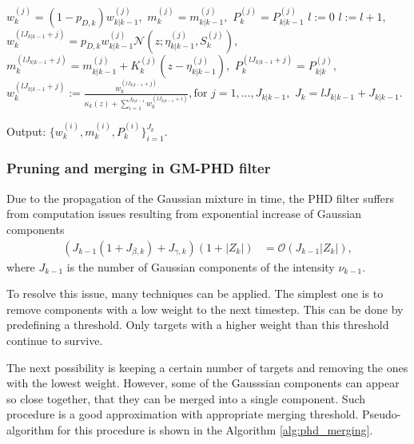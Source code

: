 \begin{algorithm}[h]
\begin{algorithmic}[1]
        \State
         
            \State $w_k^{(j)} = (1 - p_{D,k}) w_{k|k-1}^{(j)},$ \quad
             $m_k^{(j)} = m_{k|k-1}^{(j)},$ \quad
             $P_k^{(j)} = P_{k|k-1}^{(j)}$
        \EndFor
        \State $l:=0$
         
            \State $l:=l+1,$
                \State $w_k^{(l J_{k|k-1} + j)} = p_{D,k} w_{k|k-1}^{(j)} \mathcal{N}(z; \eta_{k|k-1}^{(j)},S_k^{(j)}),$
                \State $m_k^{(l J_{k|k-1} + j)} = m_{k|k-1}^{(j)} + K_k^{(j)} (z - \eta_{k|k-1}^{(j)}),$
                \State $P_k^{(l J_{k|k-1} + j)} = P_{k|k}^{(j)},$
            \EndFor
        \State $w_k^{(l J_{k|k-1} + j)} := \frac{w_k^{(l J_{k|k-1} + j)}}{\kappa_k(z) + \sum_{i=1}^{J_{k|k-1}} w_k^{(
            l J_{k|k-1} + i)}}, \text{for $j = 1,\dots,J_{k|k-1}$},$
        \EndFor
        \State $J_k = l J_{k|k-1} + J_{k|k-1}.$
        \EndProcedure

        \State Output: $\{ w_k^{(i)}, m_k^{(i)}, P_k^{(i)} \}_{i=1}^{J_k}$.
    \end{algorithmic}
    \label{alg:phd}
\end{algorithm}

        \subsubsection{Pruning and merging in GM-PHD filter}
\label{sec:phd_pruning_and_merging}
Due to the propagation of the Gaussian mixture in time, the PHD filter suffers from computation issues resulting from
exponential increase of Gaussian components
\begin{align}
(J_{k-1} (1 + J_{\beta,k}) + J_{\gamma,k}) (1 + |Z_k|) &= \mathcal{O}(J_{k-1} |Z_k|),
\end{align}
where $J_{k-1}$ is the number of Gaussian components of the intensity $\nu_{k-1}$.

To resolve this issue, many techniques can be applied. The simplest one is to remove components with a low weight to the next timestep. This can be done by predefining a threshold. Only targets with a higher weight than this threshold continue to survive.

The next possibility is keeping a certain number of targets and removing the ones with the lowest weight. However,
some of the Gausssian components can appear so close together, that they can be merged into a single component. Such
procedure is a good approximation with appropriate merging threshold. Pseudo-algorithm for this procedure is shown in the Algorithm \ref{alg:phd_merging}.

